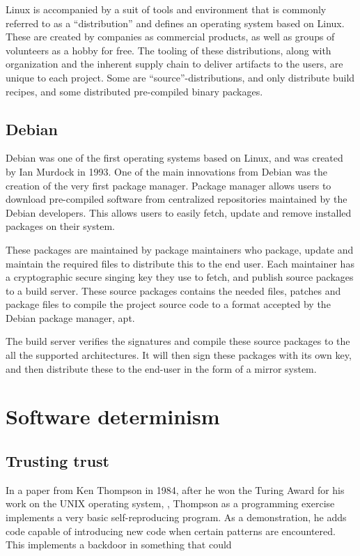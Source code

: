\documentclass[../Main/thesis.tex]{subfiles}
\begin{document}
Linux is accompanied by a suit of tools and environment that is commonly
referred to as a ``distribution'' and defines an operating system based on
Linux. These are created by companies as commercial products, as well as groups
of volunteers as a hobby for free. The tooling of these distributions, along
with organization and the inherent supply chain to deliver artifacts to the
users, are unique to each project. Some are ``source''-distributions, and only
distribute build recipes, and some distributed pre-compiled binary packages.


\subsection*{Debian}
Debian was one of the first operating systems based on Linux, and was created by
Ian Murdock in 1993. One of the main innovations from Debian was the creation of
the very first package manager. Package manager allows users to download
pre-compiled software from centralized repositories maintained by the Debian
developers. This allows users to easily fetch, update and remove installed
packages on their system.

These packages are maintained by package maintainers who package, update and
maintain the required files to distribute this to the end user. Each maintainer
has a cryptographic secure singing key they use to fetch, and publish source
packages to a build server. These source packages contains the needed files,
patches and package files to compile the project source code to a format
accepted by the Debian package manager, apt.

The build server verifies the signatures and compile these source packages to
the all the supported architectures. It will then sign these packages with its
own key, and then distribute these to the end-user in the form of a mirror
system.


\section{Software determinism}\label{sec:reproducible_builds}


\subsection*{Trusting trust}
In a paper from Ken Thompson in 1984, after he won the Turing Award for his work
on the UNIX operating system, , Thompson as a
programming exercise implements a very basic self-reproducing program. As a
demonstration, he adds code capable of introducing new code when certain
patterns are encountered. This implements a backdoor in something that could
\end{document}
